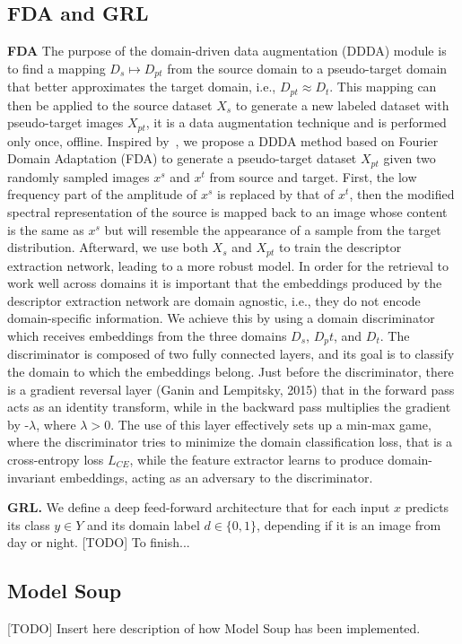 \documentclass[10pt,twocolumn,letterpaper]{article}
\begin{document}
\subsection{FDA and GRL}
\textbf{FDA}
The purpose of the domain-driven data augmentation (DDDA) module is to find a mapping $D_s \mapsto D_{pt}$ from the source domain to a pseudo-target domain that better approximates the target domain, i.e., $D_{pt} \approx D_t$. This mapping can then be applied to the source dataset $X_s$ to generate a new labeled dataset with pseudo-target images $X_{pt}$, it is a data augmentation technique and is performed only once, offline. Inspired by~\cite{fda, adageo}, we propose a DDDA method based on Fourier Domain Adaptation (FDA) to generate a pseudo-target dataset $X_{pt}$ given two randomly sampled images $x^s$ and $x^t$ from source and target. First, the low frequency part of the amplitude of $x^s$ is replaced by that of $x^t$, then the modified spectral representation of the source is mapped back to an image whose content is the same as $x^s$ but will resemble the appearance of a sample from the target distribution.
\newline
Afterward, we use both $X_s$ and $X_{pt}$ to train the descriptor extraction network, leading to a more robust model.
In order for the retrieval to work well across domains it is important that the embeddings produced by the descriptor extraction network are domain agnostic, i.e., they do not encode domain-specific information. We achieve this by using a domain discriminator which receives embeddings from the three domains $D_s$, $D_pt$, and $D_t$. The discriminator is composed of two fully connected layers, and its goal is to classify the domain to which the embeddings belong. Just before the discriminator, there is a gradient reversal layer (Ganin and Lempitsky, 2015) that in the forward pass acts as an identity transform, while in the backward pass multiplies the gradient by -$\lambda$, where $\lambda > 0$. The use of this layer effectively sets up a min-max game, where the discriminator tries to minimize the domain classification loss, that is a cross-entropy loss $L_{CE}$, while the feature extractor learns to produce domain-invariant embeddings, acting as an adversary to the discriminator.

\textbf{GRL.} We define a deep feed-forward architecture that for each input $x$ predicts its class $y \in Y$ and its domain label $d \in \{0, 1\}$, depending if it is an image from day or night.
[TODO] To finish...

\subsection{Model Soup}
[TODO] Insert here description of how Model Soup has been implemented.
\end{document}
